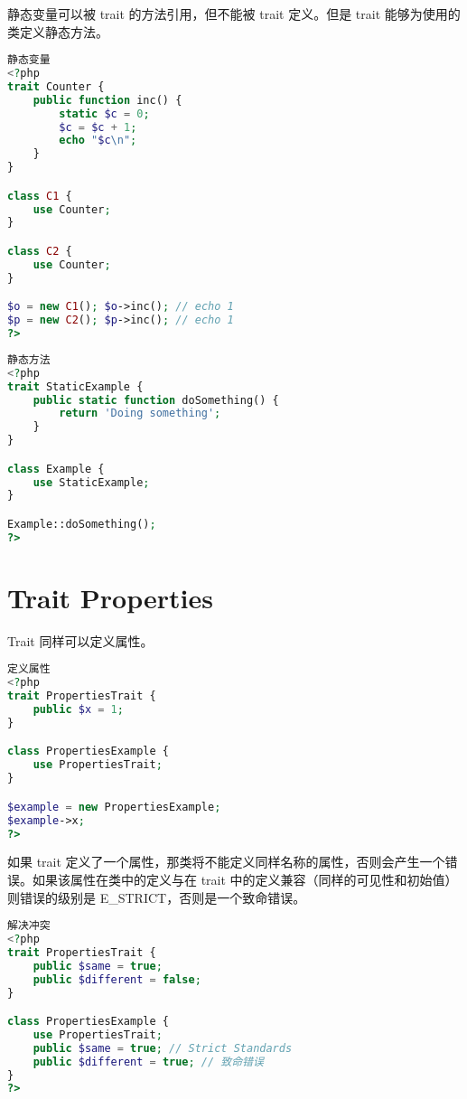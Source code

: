 静态变量可以被 trait 的方法引用，但不能被 trait 定义。但是 trait 能够为使用的类定义静态方法。


\begin{lstlisting}[language=PHP]
静态变量
<?php
trait Counter {
    public function inc() {
        static $c = 0;
        $c = $c + 1;
        echo "$c\n";
    }
}

class C1 {
    use Counter;
}

class C2 {
    use Counter;
}

$o = new C1(); $o->inc(); // echo 1
$p = new C2(); $p->inc(); // echo 1
?>
\end{lstlisting}



\begin{lstlisting}[language=PHP]
静态方法
<?php
trait StaticExample {
    public static function doSomething() {
        return 'Doing something';
    }
}

class Example {
    use StaticExample;
}

Example::doSomething();
?>
\end{lstlisting}





\section{Trait Properties}

Trait 同样可以定义属性。

\begin{lstlisting}[language=PHP]
定义属性
<?php
trait PropertiesTrait {
    public $x = 1;
}

class PropertiesExample {
    use PropertiesTrait;
}

$example = new PropertiesExample;
$example->x;
?>
\end{lstlisting}

如果 trait 定义了一个属性，那类将不能定义同样名称的属性，否则会产生一个错误。如果该属性在类中的定义与在 trait 中的定义兼容（同样的可见性和初始值）则错误的级别是 E\_STRICT，否则是一个致命错误。

\begin{lstlisting}[language=PHP]
解决冲突
<?php
trait PropertiesTrait {
    public $same = true;
    public $different = false;
}

class PropertiesExample {
    use PropertiesTrait;
    public $same = true; // Strict Standards
    public $different = true; // 致命错误
}
?>
\end{lstlisting}

